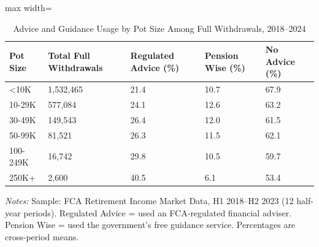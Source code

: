 \begin{table}[!h]
\centering
\caption{\label{tab:tab:advice}Advice and Guidance Usage by Pot Size Among Full Withdrawals, 2018--2024}
\centering
\begin{adjustbox}{max width=\textwidth}
\begin{threeparttable}
\begin{tabular}[t]{lllll}
\toprule
Pot Size & Total Full Withdrawals & Regulated Advice (\%) & Pension Wise (\%) & No Advice (\%)\\
\midrule
<10K & 1,532,465 & 21.4 & 10.7 & 67.9\\
10-29K & 577,084 & 24.1 & 12.6 & 63.2\\
30-49K & 149,543 & 26.4 & 12.0 & 61.5\\
50-99K & 81,521 & 26.3 & 11.5 & 62.1\\
100-249K & 16,742 & 29.8 & 10.5 & 59.7\\
\addlinespace
250K+ & 2,600 & 40.5 & 6.1 & 53.4\\
\bottomrule
\end{tabular}
\begin{tablenotes}[flushleft]\footnotesize
\item[] \textit{Notes:} Sample: FCA Retirement Income Market Data, H1 2018--H2 2023 (12 half-year periods). Regulated Advice = used an FCA-regulated financial adviser. Pension Wise = used the government's free guidance service. Percentages are cross-period means.
\end{tablenotes}
\end{threeparttable}
\end{adjustbox}
\end{table}
